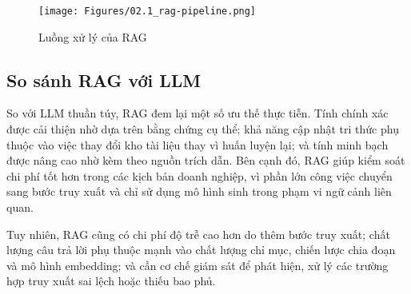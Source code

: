 \begin{figure}[H]
    \centering
    \texttt{[image: Figures/02.1\_rag-pipeline.png]}
    \caption{Luồng xử lý của RAG}
    \label{fig:rag}
\end{figure}

\subsection{So sánh RAG với LLM}

So với LLM thuần túy, RAG đem lại một số ưu thế thực tiễn. Tính chính xác được cải thiện nhờ dựa trên bằng chứng cụ thể; khả năng cập nhật tri thức phụ thuộc vào việc thay đổi kho tài liệu thay vì huấn luyện lại; và tính minh bạch được nâng cao nhờ kèm theo nguồn trích dẫn. Bên cạnh đó, RAG giúp kiểm soát chi phí tốt hơn trong các kịch bản doanh nghiệp, vì phần lớn công việc chuyển sang bước truy xuất và chỉ sử dụng mô hình sinh trong phạm vi ngữ cảnh liên quan.

Tuy nhiên, RAG cũng có chi phí độ trễ cao hơn do thêm bước truy xuất; chất lượng câu trả lời phụ thuộc mạnh vào chất lượng chỉ mục, chiến lược chia đoạn và mô hình embedding; và cần cơ chế giám sát để phát hiện, xử lý các trường hợp truy xuất sai lệch hoặc thiếu bao phủ.












